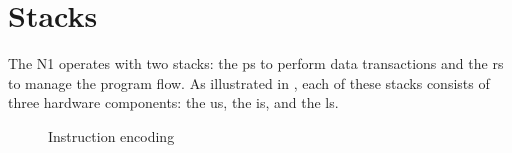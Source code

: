 
\section{Stacks}
\label{stacks}

The N1 operates with two stacks: the \gls{ps} to perform data transactions and the
\gls{rs} to manage the program flow. As illustrated in , each of
these stacks consists of three hardware components: the \gls{us}, the \gls{is},
and the \gls{ls}.

\begin{figure}[!h]
  \caption{Instruction encoding}
  \label{stacks:fig}
\end{figure}

